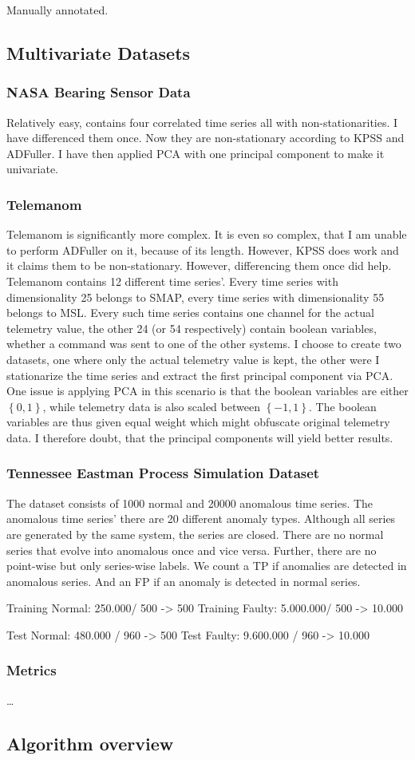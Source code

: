Manually annotated.





\subsection{Multivariate Datasets}

\subsubsection{NASA Bearing Sensor Data}
Relatively easy, contains four correlated time series all with non-stationarities.
I have differenced them once. Now they are non-stationary according to KPSS and
ADFuller. I have then applied PCA with one principal component to make it univariate.

\subsubsection{Telemanom}
Telemanom is significantly more complex. It is even so complex, that I am unable
to perform ADFuller on it, because of its length. However, KPSS does work and it
claims them to be non-stationary. However, differencing them once did help.
Telemanom contains 12 different time series'. Every time series with dimensionality
25 belongs to SMAP, every time series with dimensionality 55 belongs to MSL.
Every such time series contains one channel for the actual telemetry value, the
other 24 (or 54 respectively) contain boolean variables, whether a command was
sent to one of the other systems. I choose to create two datasets, one where
only the actual telemetry value is kept, the other were I stationarize the time
series and extract the first principal component via PCA. One issue is applying
PCA in this scenario is that the boolean variables are either \(\left\{0,1\right\}\),
while telemetry data is also scaled between \(\left\{ -1, 1 \right\}\). The boolean
variables are thus given equal weight which might obfuscate original telemetry
data. I therefore doubt, that the principal components will yield better results.


\subsubsection{Tennessee Eastman Process Simulation Dataset}
The dataset consists of 1000 normal and 20000 anomalous time series. The anomalous
time series' there are 20 different anomaly types. Although all series are generated
by the same system, the series are closed. There are no normal series that evolve
into anomalous once and vice versa. Further, there are no point-wise but only
series-wise labels. We count a TP if anomalies are detected in anomalous series.
And an FP if an anomaly is detected in normal series.


Training Normal: 250.000/ 500 -> 500
Training Faulty: 5.000.000/ 500 -> 10.000

Test Normal: 480.000 / 960 -> 500
Test Faulty: 9.600.000 / 960 -> 10.000

\subsubsection{Metrics}
\dots

\subsection{Algorithm overview}